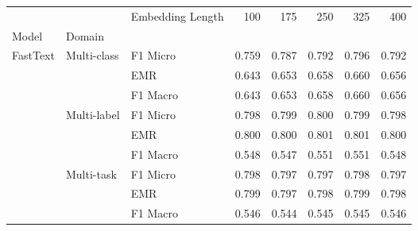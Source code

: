\begin{tabular}{lllrrrrr}
\toprule
         &             & Embedding Length &    100 &    175 &    250 &    325 &    400 \\
Model & Domain & {} &        &        &        &        &        \\
\midrule
\multirow{9}{*}{FastText} & \multirow{3}{*}{Multi-class} &  F1 Micro &  0.759 &  0.787 &  0.792 &  0.796 &  0.792 \\
         &             & EMR &  0.643 &  0.653 &  0.658 &  0.660 &  0.656 \\
         &             & F1 Macro &  0.643 &  0.653 &  0.658 &  0.660 &  0.656 \\
\cline{2-8}
         & \multirow{3}{*}{Multi-label} &  F1 Micro &  0.798 &  0.799 &  0.800 &  0.799 &  0.798 \\
         &             & EMR &  0.800 &  0.800 &  0.801 &  0.801 &  0.800 \\
         &             & F1 Macro &  0.548 &  0.547 &  0.551 &  0.551 &  0.548 \\
\cline{2-8}
         & \multirow{3}{*}{Multi-task} &  F1 Micro &  0.798 &  0.797 &  0.797 &  0.798 &  0.797 \\
         &             & EMR &  0.799 &  0.797 &  0.798 &  0.799 &  0.798 \\
         &             & F1 Macro &  0.546 &  0.544 &  0.545 &  0.545 &  0.546 \\
\bottomrule
\end{tabular}
